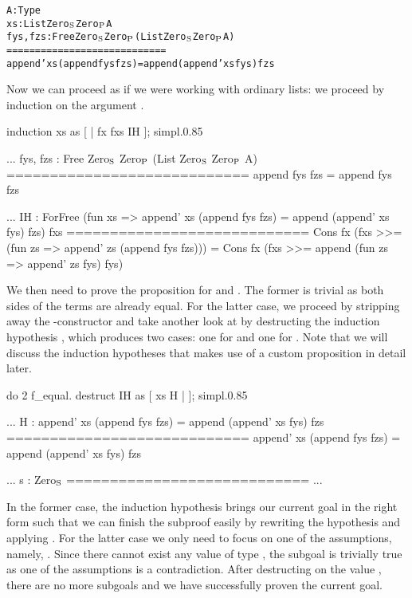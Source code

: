 \begin{alltt}
  A : Type
  xs : List Zero\(\sb{\text{S}}\) Zero\(\sb{\text{P}}\) A
  fys, fzs : Free Zero\(\sb{\text{S}}\) Zero\(\sb{\text{P}}\) (List Zero\(\sb{\text{S}}\) Zero\(\sb{\text{P}}\) A)
  ============================
  append' xs (append fys fzs) = append (append' xs fys) fzs
\end{alltt}

Now we can proceed as if we were working with ordinary lists: we proceed by induction on the  argument .

\begin{cproof2}{induction xs as [ | fx fxs IH ]; simpl.}{0.85}
  
  ...
  fys, fzs : Free Zero\(\sb{\text{S}}\) Zero\(\sb{\text{P}}\) (List Zero\(\sb{\text{S}}\) Zero\(\sb{\text{P}}\) A)
  ============================
  append fys fzs = append fys fzs

  ...
  IH : ForFree (fun xs => append' xs (append fys fzs)
                        = append (append' xs fys) fzs) fxs
  ============================
  Cons fx (fxs >>= (fun zs => append' zs (append fys fzs))) =
  Cons fx (fxs >>= append (fun zs => append' zs fys) fys)
\end{cproof2}

We then need to prove the proposition for  and .
The former is trivial as both sides of the terms are already equal.
For the latter case, we proceed by stripping away the \--constructor and take another look at  by destructing the induction hypothesis , which produces two cases: one for  and one for .
Note that we will discuss the induction hypotheses  that makes use of a custom proposition  in detail later.

\begin{cproof2}{do 2 f_equal. destruct IH as [ xs H | ]; simpl.}{0.85}
  
  ...
  H : append' xs (append fys fzs) = append (append' xs fys) fzs
  ============================
  append' xs (append fys fzs) = append (append' xs fys) fzs

  ...
  s : Zero\(\sb{\text{S}}\)
  ============================
  ...
\end{cproof2}

In the former case, the induction hypothesis brings our current goal in the right form such that we can finish the subproof easily by rewriting the hypothesis  and applying .
For the latter case we only need to focus on one of the assumptions, namely, .
Since there cannot exist any value of type , the subgoal is trivially true as one of the assumptions is a contradiction.
After destructing on the value , there are no more subgoals and we have successfully proven the current goal.

